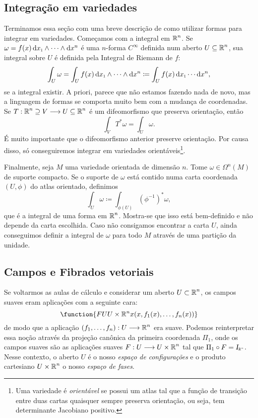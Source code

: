 \subsection{Integração em variedades}
	Terminamos essa seção com uma breve descrição de como utilizar formas para integrar em variedades. Começamos com a integral em $\operatorname{\mathbb{R}}^n$. Se $\omega = f(x) \,\de{\sub x1} \wedge \dotsb \wedge \de{x^n}$ é uma $n$-forma $C^{\infty}$ definida num aberto $U \subseteq \operatorname{\mathbb{R}}^n$, sua integral sobre $U$ é definida pela Integral de Riemann de $f$:
	\[
	\int_U \omega = \int_U f(x) \,\de{\sub x1} \wedge \dotsb \wedge \de{x^n} \coloneqq \int_U f(x) \,\de{\sub x1}\dotsb \de{x^n},
	\]
	se a integral existir. A priori, parece que não estamos fazendo nada de novo, mas a linguagem de formas se comporta muito bem com a mudança de coordenadas. Se $T: \operatorname{\mathbb{R}}^n \supseteq V \longrightarrow U \subseteq \operatorname{\mathbb{R}}^n$ é um difeomorfismo que preserva orientação, então
	\[
	\int_V T^*\omega = \int_U \omega.
	\]
	É muito importante que o difeomorfismo anterior preserve orientação. Por causa disso, só conseguiremos integrar em variedades orientáveis\footnote{Uma variedade é \textit{orientável} se possui um atlas tal que a função de transição entre duas cartas quaisquer sempre preserva orientação, ou seja, tem determinante Jacobiano positivo.}.
	
	Finalmente, seja $M$ uma variedade orientada de dimensão $n$. Tome $\omega \in \Omega^n(M)$ de suporte compacto. Se o suporte de $\omega$ está contido numa carta coordenada $(U,\phi)$ do atlas orientado, definimos
	\[
	\int_U \omega \coloneqq \int_{\phi(U)}(\phi^{-1})^*\omega,
	\]
	que é a integral de uma forma em $\operatorname{\mathbb{R}}^n$. Mostra-se que isso está bem-definido e não depende da carta escolhida. Caso não consigamos encontrar a carta $U$, ainda conseguimos definir a integral de $\omega$ para todo $M$ através de uma partição da unidade.

\subsection{Campos e Fibrados vetoriais}
Se voltarmos as aulas de cálculo e considerar um aberto $U\subset \operatorname{\mathbb{R}}^n$, os campos suaves eram aplicações com a seguinte cara:
\begin{equation*}
	\function{{F}{U}{U\times \R^n}{x}{(x, f_1(x), \ldots, f_n(x))}}
\end{equation*}
de modo que a aplicação $(f_1,\ldots, f_n):U \longrightarrow \operatorname{\mathbb{R}}^n$ era suave. Podemos reinterpretar essa noção através da projeção canônica da primeira coordenada $\Pi_1$, onde os campos suaves são as aplicações suaves $F: U \longrightarrow U\times \operatorname{\mathbb{R}}^n$ tal que $\Pi_1 \circ F = \sub{\Id}{\R^n}$. Nesse contexto, o aberto $U$ é o nosso \textit{espaço de configurações} e o produto cartesiano $U\times \operatorname{\mathbb{R}}^n$ o nosso \textit{espaço de fases}.

